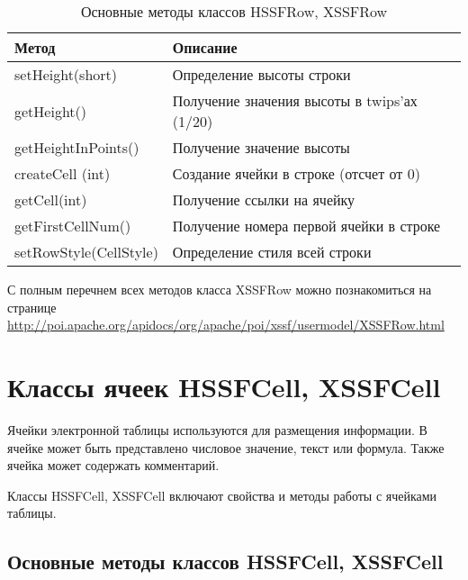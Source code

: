 \begin{table}[h!]
	\begin{center}
		\caption{Основные методы классов HSSFRow, XSSFRow}
		\label{tab:listOfComponentsWithSheets}
		\begin{tabular}{l|l}
			\textbf{Метод} & \textbf{Описание} \\
			\hline
			setHeight(short) & Определение высоты строки \\
			getHeight() & Получение значения высоты в twips'ах (1/20) \\
			getHeightInPoints()  & Получение значение высоты \\ 
			createCell (int) & Создание ячейки в строке (отсчет от 0) \\
			getCell(int) & Получение ссылки на ячейку \\
			getFirstCellNum() & Получение номера первой ячейки в строке \\
			setRowStyle(CellStyle) & Определение стиля всей строки\\
		\end{tabular}
	\end{center}
\end{table}


С полным перечнем всех методов класса XSSFRow можно познакомиться на странице \href{http://poi.apache.org/apidocs/org/apache/poi/xssf/usermodel/XSSFRow.html}{http://poi.apache.org/apidocs/org/apache/poi/xssf/usermodel/XSSFRow.html}

\section{Классы ячеек HSSFCell, XSSFCell}

Ячейки электронной таблицы используются для размещения информации. В ячейке может быть представлено числовое значение, текст или формула. Также ячейка может содержать комментарий.

Классы HSSFCell, XSSFCell включают свойства и методы работы с ячейками таблицы.
\subsection{Основные методы классов HSSFCell, XSSFCell}


